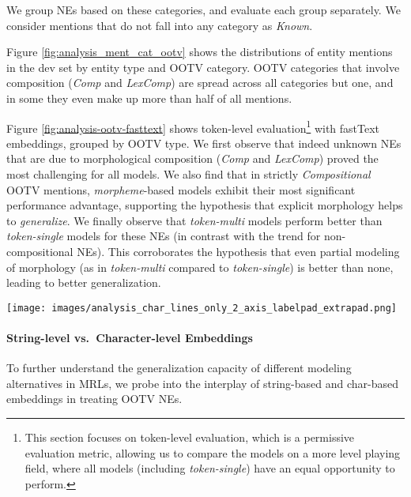 \documentclass[11pt,a4paper]{article}
\newcommand{\TOKMACRO}{{\em token-single}\xspace}
\newcommand{\MULMACRO}{{\em token-multi}\xspace}
\newcommand{\MORMACRO}{{\em morpheme}\xspace}
\begin{document}
We group NEs based on these categories, and evaluate each group separately. We consider mentions that do not fall into any category as \emph{Known}.

Figure \ref{fig:analysis_ment_cat_ootv} shows the distributions of entity mentions in the dev set by entity type and OOTV category.
OOTV categories that involve composition ({\em Comp} and {\em LexComp}) are spread across all  categories but one, and in some they even make up more than half of all mentions.  





Figure \ref{fig:analysis-ootv-fasttext} shows token-level evaluation\footnote{This section focuses on token-level  evaluation, which is a  permissive evaluation metric,
allowing us to compare the models on a more level playing field, where all models (including \TOKMACRO) have an equal opportunity to perform.}  with fastText embeddings, grouped by OOTV type. We first observe that indeed unknown NEs that are due to  morphological composition (\emph{Comp} and \emph{LexComp}) proved the most challenging for {all} models. We also find that in strictly \emph{Compositional} OOTV mentions, \MORMACRO-based models exhibit their most significant performance advantage, supporting the hypothesis that explicit {morphology} helps to {\em generalize}.  We finally observe that \MULMACRO models perform better than \TOKMACRO models for these NEs (in contrast with the trend for non-compositional  NEs). This  corroborates the hypothesis that even partial modeling of morphology (as in  \MULMACRO compared to \TOKMACRO) is better than none, leading to better generalization. 




\begin{figure*}[t]
  \texttt{[image: images/analysis\_char\_lines\_only\_2\_axis\_labelpad\_extrapad.png]}
  \caption{\label{fig:analysis_char} 
  Token-Level Eval.\ on Dev for Different OOTV Types, Char- and Word-Embeddings.}
\end{figure*}
\paragraph{String-level vs.\ Character-level Embeddings} 

To further understand the generalization capacity of different modeling alternatives in MRLs, we probe into the interplay of string-based and char-based embeddings in treating OOTV NEs. 
\end{document}
